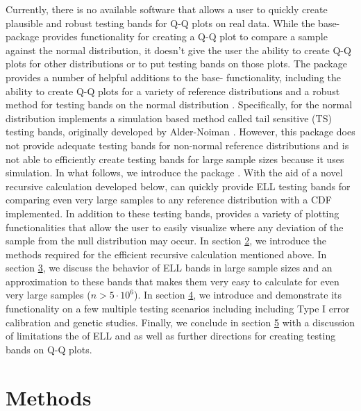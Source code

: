 \documentclass[article]{jss}
\begin{document}
\newline
\newline
Currently, there is no available software that allows a user to quickly create plausible and robust testing bands for Q-Q plots on real data. While the base- package  provides functionality for creating a Q-Q plot to compare a sample against the normal distribution, it doesn't give the user the ability to create Q-Q plots for other distributions or to put testing bands on those plots. The package  provides a number of helpful additions to the base- functionality, including the ability to create Q-Q plots for a variety of reference distributions and a robust method for testing bands on the normal distribution \citep{qqplotr}. Specifically, for the normal distribution  implements a simulation based method called tail sensitive (TS) testing bands, originally developed by Alder-Noiman \citep{aldor2013power}.  However, this package does not provide adequate testing bands for non-normal reference distributions and is not able to efficiently create testing bands for large sample sizes because it uses simulation.
\newline
\newline
In what follows, we introduce the  package . With the aid of a novel recursive calculation developed below,  can quickly provide ELL testing bands for comparing even very large samples to any reference distribution with a CDF implemented. In addition to these testing bands,  provides a variety of plotting functionalities that allow the user to easily visualize where any deviation of the sample from the null distribution may occur. In section \hyperref[sec:methods]{2}, we introduce the methods required for the efficient recursive calculation mentioned above. In section \hyperref[sec:methods]{3}, we discuss the behavior of ELL bands in large sample sizes and an approximation to these bands that makes them very easy to calculate for even very large samples ($n > 5 \cdot 10^{6}$). In section \hyperref[sec:examples]{4}, we introduce  and demonstrate its functionality on a few multiple testing scenarios including including Type I error calibration and genetic studies. Finally, we conclude in section \hyperref[sec:discussion]{5} with a discussion of limitations the of ELL and  as well as further directions for creating testing bands on Q-Q plots.
\section{Methods}
\label{sec:methods}
\end{document}
